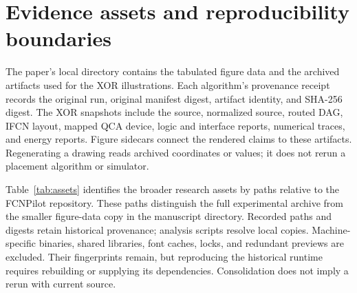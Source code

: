 \documentclass[11pt,a4paper]{article}
\newcommand{\repo}[1]{\path{#1}}
\begin{document}
\section{Evidence assets and reproducibility boundaries}
The paper's local \repo{paper/data/} directory contains the tabulated figure data and the archived \repo{device_runs/} artifacts used for the XOR illustrations. Each algorithm's provenance receipt records the original run, original manifest digest, artifact identity, and SHA-256 digest. The XOR snapshots include the source, normalized source, routed DAG, IFCN layout, mapped QCA device, logic and interface reports, numerical traces, and energy reports. Figure sidecars connect the rendered claims to these artifacts. Regenerating a drawing reads archived coordinates or values; it does not rerun a placement algorithm or simulator.

Table~\ref{tab:assets} identifies the broader research assets by paths relative to the FCNPilot repository. These paths distinguish the full experimental archive from the smaller figure-data copy in the manuscript directory. Recorded paths and digests retain historical provenance; analysis scripts resolve local copies. Machine-specific binaries, shared libraries, font caches, locks, and redundant previews are excluded. Their fingerprints remain, but reproducing the historical runtime requires rebuilding or supplying its dependencies. Consolidation does not imply a rerun with current source.
\end{document}
